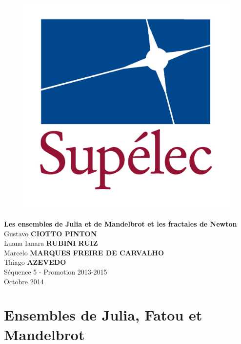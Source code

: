 \documentclass{article}
\theoremstyle{definition}
\begin{document}
\begin{titlepage}
\vspace*{.18\textheight}
\begin{center}
%
\begin{figure}[h]
\centering
\includegraphics[scale=0.12]{images/LogoSupelec}
\end{figure}
%
\vspace*{10pt}
\textbf{\LARGE Les ensembles de Julia et de Mandelbrot et les fractales de Newton} \\[0.5 cm]

Gustavo \textbf{CIOTTO PINTON}\\
Luana Ianara \textbf{RUBINI RUIZ}\\
Marcelo \textbf{MARQUES FREIRE DE CARVALHO}\\
Thiago \textbf{AZEVEDO}\\

\vspace*{10pt}
Séquence 5 - Promotion 2013-2015\\[1 cm]

\vspace*{60pt}
Octobre 2014

\end{center}
\end{titlepage}

\section{Ensembles de Julia, Fatou et Mandelbrot}
\end{document}
